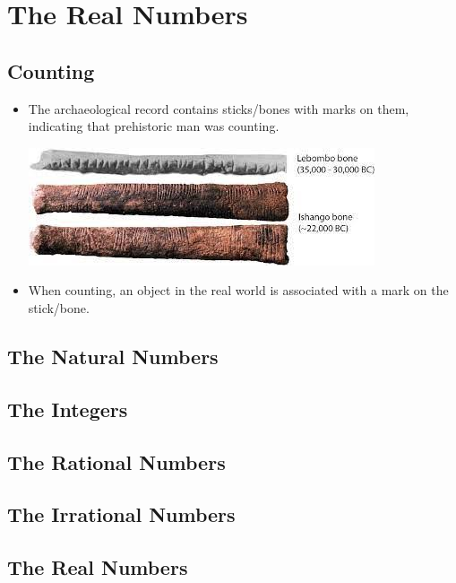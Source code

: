 \documentclass[letterpaper,12pt,fleqn]{article}
\begin{document}
\section*{The Real Numbers}

\subsection*{Counting}

\begin{itemize}[left=0in]
\item The archaeological record contains sticks/bones with marks on them, indicating that prehistoric man was
  counting.
  \begin{center}
    \includegraphics{bones}
  \end{center}

\item When counting, an object in the real world is associated with a mark on the stick/bone.
  \begin{center}
  \end{center}
  
\end{itemize}

\subsection*{The Natural Numbers}

\subsection*{The Integers}

\subsection*{The Rational Numbers}

\subsection*{The Irrational Numbers}

\subsection*{The Real Numbers}
\end{document}
